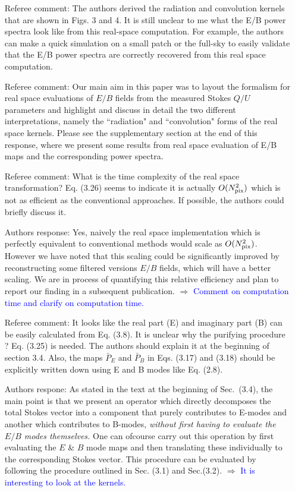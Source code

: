 \documentclass[12pt]{article}
\newcommand{\comment}{ $\Rightarrow$ \textcolor{blue}  }
\begin{document}
\begin{itemize}
\item[{Referee comment: }] The authors derived the radiation and convolution kernels that are shown in Figs. 3 and 4. It is still unclear to me what the E/B power spectra look like from this real-space computation. For example, the authors can make a quick simulation on a small patch or the full-sky to easily validate that the E/B power spectra are correctly recovered from this real space computation.

\item[{Referee comment: }]  Our main aim in this paper was to layout the formalism for real space evaluations of $E/B$ fields from the measured Stokes $Q/U$ parameters and highlight and discuss in detail the two different interpretations, namely the ``radiation" and ``convolution" forms of the real space kernels. Please see the supplementary section at the end of this response, where we present some results from real space evaluation of E/B maps and the corresponding power spectra.\\

\item[{Referee comment:}] What is the time complexity of the real space transformation? Eq. (3.26) seems to indicate it is actually $O(N_{\rm pix}^2 )$ which is not as efficient as the conventional approaches. If possible, the authors could briefly discuss it.

\item[{Authors response:}] Yes, naively the real space implementation which is perfectly equivalent to conventional methods would scale as $O(N_{\rm pix}^2 )$. However we have noted that this scaling could be significantly improved by reconstructing some filtered versions $E/B$ fields, which will have a better scaling. We are in process of quantifying this relative efficiency and plan to report our finding in a subsequent publication. \comment{Comment on computation time and clarify on computation time.}

\item[{Referee comment: }]It looks like the real part (E) and imaginary part (B) can be easily calculated from Eq. (3.8). It is unclear why the purifying procedure ? Eq. (3.25) is needed. The authors should explain it at the beginning of section 3.4. Also, the maps $\bar P_E$ and $\bar P_B$ in Eqs. (3.17) and (3.18) should be explicitly written down using E and B modes like Eq. (2.8).

\item[{Authors respone: }] As stated in the text at the beginning of Sec.~(3.4), the main point is that we present an operator which directly decomposes the total Stokes vector into a component that purely contributes to E-modes and another which contributes  to B-modes, \emph{without first having to evaluate the $E/B$ modes themselves.} One can ofcourse carry out this operation by first evaluating the $E$ \& $B$ mode maps and then translating these individually to the corresponding Stokes vector. This procedure can be evaluated by following the procedure outlined in Sec. (3.1) and Sec.(3.2). %
\comment{It is interesting to look at the kernels.}


\end{itemize}
\end{document}
